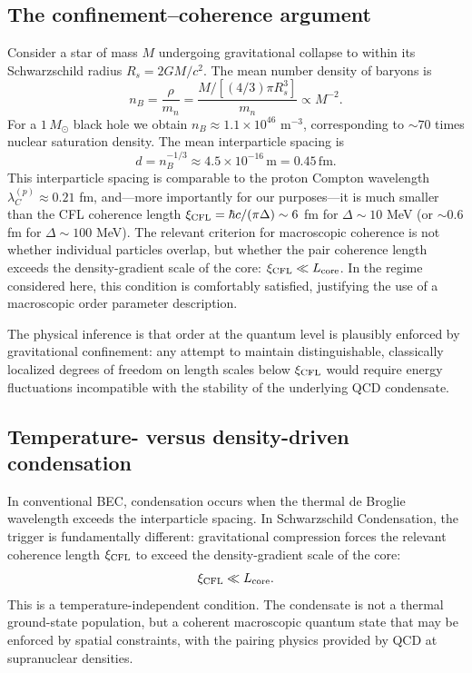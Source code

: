 \documentclass[epj]{svjour}
\begin{document}
\subsection{The confinement--coherence argument}
\label{sec:confinement}

Consider a star of mass $M$ undergoing gravitational collapse to within its Schwarzschild radius $R_s = 2GM/c^2$. The mean number density of baryons is
\begin{equation}
n_B = \frac{\rho}{m_n} = \frac{M / [(4/3)\pi R_s^3]}{m_n} \propto M^{-2}.
\end{equation}
For a $1\,M_\odot$ black hole we obtain $n_B \approx 1.1 \times 10^{46}$ m$^{-3}$, corresponding to $\sim 70$ times nuclear saturation density. The mean interparticle spacing is
\begin{equation}
d = n_B^{-1/3} \approx 4.5 \times 10^{-16}\,\mathrm{m} = 0.45\,\mathrm{fm}.
\end{equation}
This interparticle spacing is comparable to the proton Compton wavelength $\lambda_C^{(p)} \approx 0.21$ fm, and---more importantly for our purposes---it is much smaller than the CFL coherence length $\xi_{\rm CFL} = \hbar c/(\pi\Delta) \sim 6$ fm for $\Delta \sim 10$ MeV (or $\sim 0.6$ fm for $\Delta \sim 100$ MeV). The relevant criterion for macroscopic coherence is not whether individual particles overlap, but whether the pair coherence length exceeds the density-gradient scale of the core: $\xi_{\rm CFL} \ll L_{\rm core}$. In the regime considered here, this condition is comfortably satisfied, justifying the use of a macroscopic order parameter description.

The physical inference is that order at the quantum level is plausibly enforced by gravitational confinement: any attempt to maintain distinguishable, classically localized degrees of freedom on length scales below $\xi_{\rm CFL}$ would require energy fluctuations incompatible with the stability of the underlying QCD condensate.

\subsection{Temperature- versus density-driven condensation}
\label{sec:temp_vs_density}

In conventional BEC, condensation occurs when the thermal de Broglie wavelength exceeds the interparticle spacing. In Schwarzschild Condensation, the trigger is fundamentally different: gravitational compression forces the relevant coherence length $\xi_{\rm CFL}$ to exceed the density-gradient scale of the core:
\begin{equation}
\xi_{\rm CFL} \ll L_{\rm core}.
\label{eq:SC_criterion}
\end{equation}
This is a temperature-independent condition. The condensate is not a thermal ground-state population, but a coherent macroscopic quantum state that may be enforced by spatial constraints, with the pairing physics provided by QCD at supranuclear densities.
\end{document}
